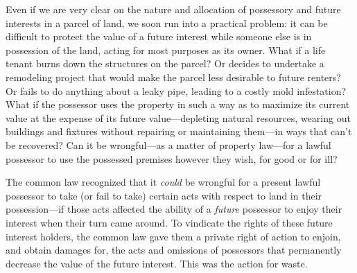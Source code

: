 Even if we are very clear on the nature and allocation of possessory and future
interests in a parcel of land, we soon run into a practical problem: it can be
difficult to protect the value of a future interest while someone else is in
possession of the land, acting for most purposes as its owner. What if a life
tenant burns down the structures on the parcel? Or decides to undertake a
remodeling project that would make the parcel less desirable to future renters?
Or fails to do anything about a leaky pipe, leading to a costly mold
infestation? What if the possessor uses the property in such a way as to
maximize its current value at the expense of its future value---depleting
natural resources, wearing out buildings and fixtures without repairing or
maintaining them---in ways that can't be recovered? Can it be wrongful---as a
matter of property law---for a lawful possessor to use the possessed premises
however they wish, for good or for ill?

The common law recognized that it \textit{could} be wrongful for a present
lawful possessor to take (or fail to take) certain acts with respect to land in
their possession---if those acts affected the ability of a \textit{future}
possessor to enjoy their interest when their turn came around. To vindicate the
rights of these future interest holders, the common law gave them a private
right of action to enjoin, and obtain damages for, the acts and omissions of
possessors that permanently decrease the value of the future interest. This was
the action for waste.

